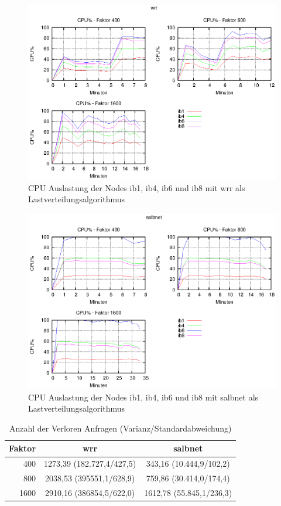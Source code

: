 \documentclass[a4paper, 12pt, BCOR10mm, DIV12, toc=bibliography, toc=listof, german]{scrbook}
\begin{document}
			\begin{figure}
				\centering
				\includegraphics[width=13cm]{plots/cpu-wrr}
				\caption{CPU Auslastung der Nodes ib1, ib4, ib6 und ib8 mit wrr als
				Lastverteilungsalgorithmus}
				\label{fig:cpu-wrr}
			\end{figure}

			\begin{figure}
				\centering
				\includegraphics[width=13cm]{plots/cpu-salbnet}
				\caption{CPU Auslastung der Nodes ib1, ib4, ib6 und ib8 mit salbnet als
				Lastverteilungsalgorithmus}
				\label{fig:cpu-salbnet}
			\end{figure}

			\begin{table}
				\centering
				\begin{tabular}{|r|c|c|}\hline
					Faktor & wrr & salbnet \\\hline\hline
					400 & 1273,39 (182.727,4/427,5) & 343,16 (10.444,9/102,2)\\
					800 & 2038,53 (395551,1/628,9) & 759,86 (30.414,0/174,4)\\
					1600 & 2910,16 (386854,5/622,0) & 1612,78 (55.845,1/236,3)\\\hline
				\end{tabular}
				\caption{Anzahl der Verloren Anfragen (Varianz/Standardabweichung)}
				\label{tab:timeout}
			\end{table}
\end{document}
